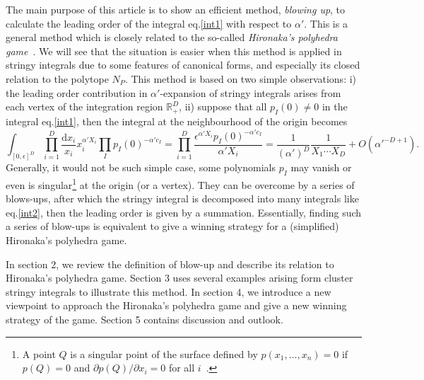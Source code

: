 \documentclass[12pt]{article}
\theoremstyle{definition}
\theoremstyle{plain}
\newcommand{\dif}{\mathrm{d}} %
\begin{document}
The main purpose of this article is to show an efficient method, {\it{blowing up}}, %
to calculate the leading order of the integral eq.\eqref{int1} with respect to $\alpha'$. This is a general method which is closely related to the so-called \emph{Hironaka's polyhedra game}~\cite{hironaka1967}. We will see that the situation is easier when this method is applied in stringy integrals due to some features of canonical forms, and especially its closed relation to the polytope $N_{P}$. This method is based on two simple observations: i) the leading order contribution in $\alpha'$-expansion of stringy integrals arises from each vertex of the integration region $\mathbb{R}_{+}^{D}$, ii) suppose that all $p_I(0)\neq 0$ in the integral eq.\eqref{int1}, then the integral at the neighbourhood of the origin becomes 
\begin{equation}\label{int2}
	\int_{[0,\epsilon]^D}\prod_{i=1}^D\frac{\dif x_i}{x_i}x_i^{\alpha' X_i} \prod_{I}p_{I}(0)^{-\alpha' c_{I}}
	=\prod_{i=1}^D\frac{\epsilon^{\alpha' X_i}p_{I}(0)^{-\alpha' c_{I}}}{\alpha' X_i}
	= \frac{1}{(\alpha')^D}\frac{1}{X_1\cdots X_D}+O(\alpha'^{-D+1}).
\end{equation}
Generally, it would not be such simple case, some polynomials $p_{I}$ may vanish or even is singular\footnote{A point $Q$ is a singular point of the surface defined by $p(x_{1},\dots,x_{n})=0$ if $p(Q)=0$ and $\partial p(Q)/\partial x_{i} =0$ for all $i$~\cite{}. } at the origin (or a vertex).
They can be overcome by a series of blows-ups, after which the stringy integral is decomposed into many integrals like eq.\eqref{int2}, then the leading order is given by a summation. %
Essentially, finding such a series of blow-ups is equivalent to give a winning strategy for a (simplified) Hironaka's polyhedra game.


In section 2, we review the definition of blow-up and describe its relation to Hironaka's polyhedra game.
Section 3 uses several examples arising form cluster stringy integrals to illustrate this method.
In section 4, we introduce a new viewpoint to approach the Hironaka's polyhedra game and give a new winning strategy of the game.
Section 5 contains discussion and outlook. 
\end{document}
